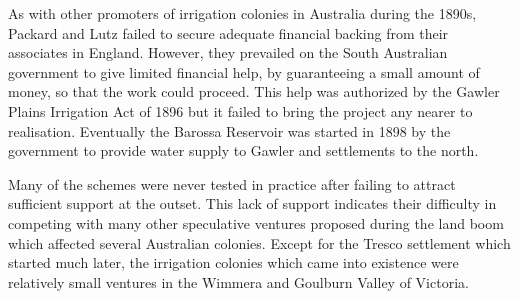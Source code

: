 As with other promoters of irrigation colonies in Australia during the
1890s, Packard and Lutz failed to secure adequate financial backing
from their associates in England.  However, they prevailed on the
South Australian government to give limited financial help, by
guaranteeing a small amount of money, so that the work could proceed.
This help was authorized by the Gawler Plains Irrigation Act of 1896
but it failed to bring the project any nearer to realisation.
Eventually the Barossa Reservoir was started in 1898 by the government
to provide water supply to Gawler and settlements to the north.

\closure
Many of the schemes were never tested in practice after failing to
attract sufficient support at the outset. This lack of support
indicates their difficulty in competing with many other speculative
ventures proposed during the land boom which affected several
Australian colonies. Except for the Tresco settlement which started
much later, the irrigation colonies which came into existence were
relatively small ventures in the Wimmera and Goulburn Valley of
Victoria.

